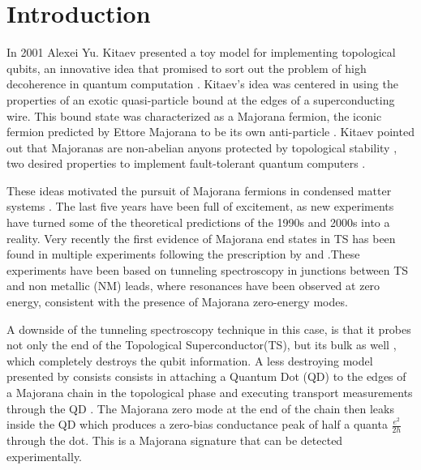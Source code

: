  \chapter{Introduction}





In 2001 Alexei Yu. Kitaev presented a toy model for implementing topological qubits, an innovative idea that promised to sort out the problem of high decoherence in quantum computation \citep{kitaev_unpaired_2001}. Kitaev's idea was centered in using the properties of an exotic quasi-particle bound at the edges of a superconducting wire. This bound state was characterized as a Majorana fermion, the iconic fermion predicted by Ettore Majorana 
to be its own anti-particle \citep{wilczek_majorana_2009}. Kitaev pointed out that Majoranas are non-abelian anyons protected by topological stability \citep{kitaev_fault-tolerant_2003}, two desired properties to implement fault-tolerant quantum computers \cite{pachos_introduction_2012}.

These ideas motivated the pursuit of Majorana fermions in condensed matter systems \citep{fu_superconducting_2008,sato_non-abelian_2009,alicea_new_2012,beenakker_search_2013}. The last five years have been full of excitement, as new experiments have turned some of the theoretical predictions of the 1990s and 2000s into a reality. Very recently the first evidence of Majorana end states
in TS has been found in multiple experiments \citep{mourik_signatures_2012,das_zero-bias_2012,deng_anomalous_2012}
following the prescription by \citet{oreg_helical_2010} and \citet{lutchyn_majorana_2010}.These experiments have been based on tunneling spectroscopy in junctions between TS and non metallic (NM) leads, where resonances have been
observed at zero energy, consistent with the presence of Majorana zero-energy modes.

A downside of the tunneling spectroscopy technique in this case, is that it probes not only the end of the Topological Superconductor(TS), but its bulk as well ,
which completely destroys the qubit information. A less destroying
model presented by \citet{liu_detecting_2011} consists consists in attaching a Quantum Dot (QD) to the edges of a Majorana chain in the topological phase and executing transport measurements through the QD \cite{liu_detecting_2011} . The Majorana zero mode at the end of the chain then leaks inside the QD \cite{vernek_subtle_2014} which produces a zero-bias conductance peak of half a quanta $\frac{e^{2}}{2h}$ through the dot. This is a Majorana signature that can be detected experimentally.

